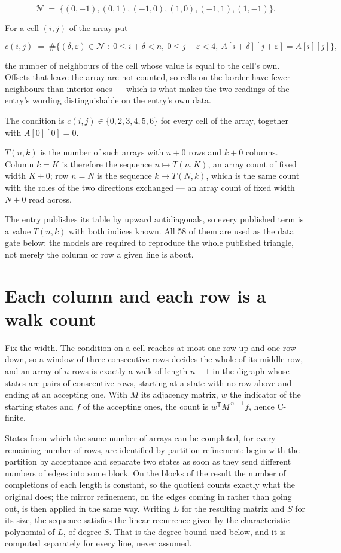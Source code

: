 \documentclass[11pt]{article}
\theoremstyle{definition}
\begin{document}
\[\mathcal{N} \;=\; \{(0,-1), (0,1), (-1,0), (1,0), (-1,1), (1,-1)\}.\]

For a cell $(i,j)$ of the array put

\[c(i,j) \;=\; \#\bigl\{(\delta,\varepsilon)\in\mathcal{N} \;:\; 0\le i+\delta<n,\ 0\le j+\varepsilon<4,\ A[i+\delta][j+\varepsilon] = A[i][j]\bigr\},\]

the number of neighbours of the cell whose value is equal to the cell's own. Offsets that leave the array are not counted, so cells on the border have fewer neighbours than interior ones --- which is what makes the two readings of the entry's wording distinguishable on the entry's own data.

The condition is $c(i,j) \in \{0, 2, 3, 4, 5, 6\}$ for every cell of the array, together with $A[0][0]=0$.

$T(n,k)$ is the number of such arrays with $n + 0$ rows and $k + 0$ columns. Column $k = K$ is therefore the sequence $n \mapsto T(n,K)$, an array count of fixed width $K + 0$; row $n = N$ is the sequence $k \mapsto T(N,k)$, which is the same count with the roles of the two directions exchanged --- an array count of fixed width $N + 0$ read across.

The entry publishes its table by upward antidiagonals, so every published term is a value $T(n,k)$ with both indices known. All 58 of them are used as the data gate below: the models are required to reproduce the whole published triangle, not merely the column or row a given line is about.

\section{Each column and each row is a walk count}

Fix the width. The condition on a cell reaches at most one row up and one row down, so a window of three consecutive rows decides the whole of its middle row, and an array of $n$ rows is exactly a walk of length $n-1$ in the digraph whose states are pairs of consecutive rows, starting at a state with no row above and ending at an accepting one. With $M$ its adjacency matrix, $w$ the indicator of the starting states and $f$ of the accepting ones, the count is $w^{\mathsf T}M^{\,n-1}f$, hence C-finite.

States from which the same number of arrays can be completed, for every remaining number of rows, are identified by partition refinement: begin with the partition by acceptance and separate two states as soon as they send different numbers of edges into some block. On the blocks of the result the number of completions of each length is constant, so the quotient counts exactly what the original does; the mirror refinement, on the edges coming in rather than going out, is then applied in the same way. Writing $L$ for the resulting matrix and $S$ for its size, the sequence satisfies the linear recurrence given by the characteristic polynomial of $L$, of degree $S$. That is the degree bound used below, and it is computed separately for every line, never assumed.
\end{document}
